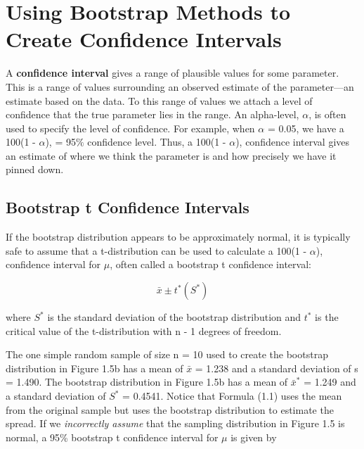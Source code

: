 \documentclass[
]{book}
\begin{document}
\hypertarget{using-bootstrap-methods-to-create-confidence-intervals}{%
\section{Using Bootstrap Methods to Create Confidence Intervals}\label{using-bootstrap-methods-to-create-confidence-intervals}}

A \textbf{confidence interval} gives a range of plausible values for some parameter. This is a range of values surrounding an observed estimate of the parameter---an estimate based on the data. To this range of values we attach a level of confidence that the true parameter lies in the range. An alpha-level, \(\alpha\), is often used to specify the level of confidence. For example, when \(\alpha\) = 0.05, we have a 100(1 - \(\alpha\)), = 95\(\%\) confidence level. Thus, a 100(1 - \(\alpha\)), confidence interval gives an estimate of where we think the parameter is and how precisely we have it pinned down.

\hypertarget{bootstrap-t-confidence-intervals}{%
\subsection*{Bootstrap t Confidence Intervals}\label{bootstrap-t-confidence-intervals}}

If the bootstrap distribution appears to be approximately normal, it is typically safe to assume that a t-distribution can be used to calculate a 100(1 - \(\alpha\)), confidence interval for \(\mu\), often called a bootstrap t confidence interval:

\begin{equation} 
  \bar{x} \pm t^*\left(S^*\right)
  \tag{1.1} \label{eq:1_1}
\end{equation}

where \(S^*\) is the standard deviation of the bootstrap distribution and \(t^*\) is the critical value of the t-distribution with n - 1 degrees of freedom.

The one simple random sample of size n = 10 used to create the bootstrap distribution in Figure 1.5b has a mean of \(\bar{x}\) = 1.238 and a standard deviation of s = 1.490. The bootstrap distribution in Figure 1.5b has a mean of \(\bar{x}^*\) = 1.249 and a standard deviation of \(S^*\) = 0.4541. Notice that Formula (1.1) uses the mean from the original sample but uses the bootstrap distribution to estimate the spread. If we \emph{incorrectly assume} that the sampling distribution in Figure 1.5 is normal, a 95\% bootstrap t confidence interval for \(\mu\) is given by
\end{document}
